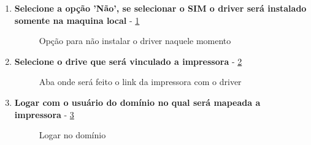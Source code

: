 \begin{enumerate}
	\item \textbf{Selecione a opção 'Não', se selecionar o SIM o driver será instalado somente na maquina local} - \ref{opcao_nao}
	\begin{figure}[ht]
	   	\centering
	   	\caption{Opção para não instalar o driver naquele momento}
	    \label{opcao_nao}
	\end{figure}
	
	\item \textbf{Selecione o drive que será vinculado a impressora} - \ref{aba_avancado}
	\begin{figure}[ht]
	   	\centering
	   	\caption{Aba onde será feito o link da impressora com o driver}
	    \label{aba_avancado}
	\end{figure}
	
	\item \textbf{Logar com o usuário do domínio no qual será mapeada a impressora} - \ref{login_dominio}
	\begin{figure}[ht]
	   	\centering
	   	\caption{Logar no domínio}
	    \label{login_dominio}
	\end{figure}
	

\end{enumerate}
